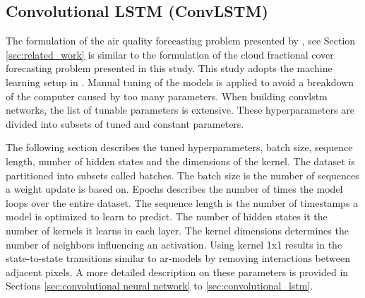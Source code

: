 \subsection{Convolutional LSTM (ConvLSTM)}

The formulation of the air quality forecasting problem presented by \citeauthor{SunAirLSTM}, see Section \ref{sec:related_work} is similar to the formulation of the cloud fractional cover forecasting problem presented in this study. This study adopts the machine learning setup in . Manual tuning of the models is applied to avoid a breakdown of the computer caused by too many parameters. When building \acrshort{convlstm} networks, the list of tunable parameters is extensive. These hyperparameters are divided into subsets of tuned and constant parameters.

The following section describes the tuned hyperparameters, batch size, sequence length, number of hidden states and the dimensions of the kernel. The dataset is partitioned into subsets called batches. The batch size is the number of sequences a weight update is based on. Epochs describes the number of times the model loops over the entire dataset. The sequence length is the number of timestamps a model is optimized to learn to predict. The number of hidden states it the number of kernels it learns in each layer. %
The kernel dimensions determines the number of neighbors influencing an activation. Using kernel 1x1 results in the state-to-state transitions similar to \acrshort{ar}-models by removing interactions between adjacent pixels. A more detailed description on these parameters is provided in Sections \ref{sec:convolutional neural network} to \ref{sec:convolutional_lstm}. 

